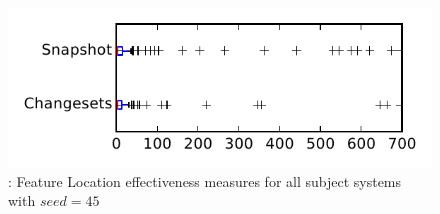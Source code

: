 
\begin{figure}
\centering
\includegraphics[height=0.4\textheight]{figures/flt_seed/rq1_tiny_45}
\caption{\rone: Feature Location effectiveness measures for all subject systems with $seed=45$}
\label{fig:flt_seed:rq1:tiny}
\end{figure}
